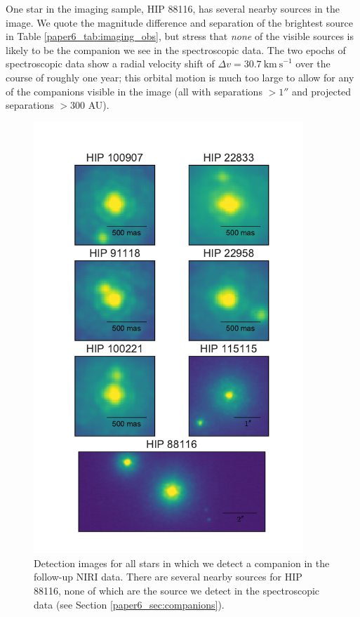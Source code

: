 One star in the imaging sample, HIP 88116, has several nearby sources in the image. We quote the magnitude difference and separation of the brightest source in Table \ref{paper6_tab:imaging_obs}, but stress that \emph{none} of the visible sources is likely to be the companion we see in the spectroscopic data. The two epochs of spectroscopic data show a radial velocity shift of $\Delta v = 30.7\ \mathrm{km\ s}^{-1}$ over the course of roughly one year; this orbital motion is much too large to allow for any of the companions visible in the image (all with separations $ > 1''$ and projected separations $ > 300$ AU).

\begin{figure}[t]
\centering
\includegraphics[width=4in]{Figures/paper6_Imaging_Data.pdf}
\caption{Detection images for all stars in which we detect a companion in the follow-up NIRI data. 
There are several nearby sources for HIP 88116, none of which are the source we detect in the 
spectroscopic data (see Section \ref{paper6_sec:companions}).}
\label{paper6_fig:images}
\end{figure}





